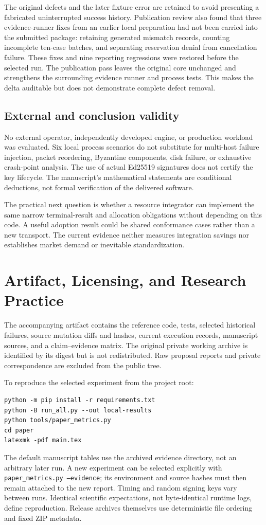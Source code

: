 \documentclass[10pt,journal,a4paper]{IEEEtran}
\newcommand{\code}[1]{\texttt{#1}}
\begin{document}
The original defects and the later fixture error are retained to avoid presenting a fabricated uninterrupted success history. Publication review also found that three evidence-runner fixes from an earlier local preparation had not been carried into the submitted package: retaining generated mismatch records, counting incomplete ten-case batches, and separating reservation denial from cancellation failure. These fixes and nine reporting regressions were restored before the selected run. The publication pass leaves the original core unchanged and strengthens the surrounding evidence runner and process tests. This makes the delta auditable but does not demonstrate complete defect removal.

\subsection{External and conclusion validity}
No external operator, independently developed engine, or production workload was evaluated. Six local process scenarios do not substitute for multi-host failure injection, packet reordering, Byzantine components, disk failure, or exhaustive crash-point analysis. The use of actual Ed25519 signatures does not certify the key lifecycle. The manuscript's mathematical statements are conditional deductions, not formal verification of the delivered software.

The practical next question is whether a resource integrator can implement the same narrow terminal-result and allocation obligations without depending on this code. A useful adoption result could be shared conformance cases rather than a new transport. The current evidence neither measures integration savings nor establishes market demand or inevitable standardization.

\section{Artifact, Licensing, and Research Practice}
The accompanying artifact contains the reference code, tests, selected historical failures, source mutation diffs and hashes, current execution records, manuscript sources, and a claim--evidence matrix. The original private working archive is identified by its digest but is not redistributed. Raw proposal reports and private correspondence are excluded from the public tree.

To reproduce the selected experiment from the project root:
\begin{verbatim}
python -m pip install -r requirements.txt
python -B run_all.py --out local-results
python tools/paper_metrics.py
cd paper
latexmk -pdf main.tex
\end{verbatim}
The default manuscript tables use the archived evidence directory, not an arbitrary later run. A new experiment can be selected explicitly with \code{paper\_metrics.py --evidence}; its environment and source hashes must then remain attached to the new report. Timing and random signing keys vary between runs. Identical scientific expectations, not byte-identical runtime logs, define reproduction. Release archives themselves use deterministic file ordering and fixed ZIP metadata.
\end{document}
